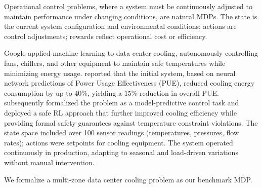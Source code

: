 Operational control problems, where a system must be continuously adjusted to maintain performance under changing conditions, are natural MDPs. The state is the current system configuration and environmental conditions; actions are control adjustments; rewards reflect operational cost or efficiency.

Google applied machine learning to data center cooling, autonomously controlling fans, chillers, and other equipment to maintain safe temperatures while minimizing energy usage. \citet{Gao2014} reported that the initial system, based on neural network predictions of Power Usage Effectiveness (PUE), reduced cooling energy consumption by up to $40\%$, yielding a $15\%$ reduction in overall PUE. \citet{Lazic2018} subsequently formalized the problem as a model-predictive control task and deployed a safe RL approach that further improved cooling efficiency while providing formal safety guarantees against temperature constraint violations. The state space included over 100 sensor readings (temperatures, pressures, flow rates); actions were setpoints for cooling equipment. The system operated continuously in production, adapting to seasonal and load-driven variations without manual intervention.

We formalize a multi-zone data center cooling problem as our benchmark MDP.

